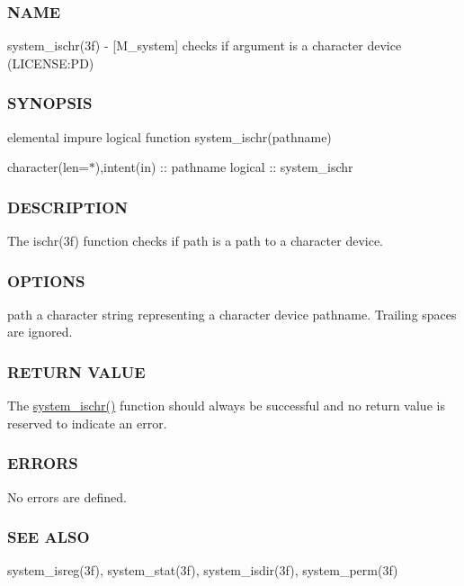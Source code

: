 \subsubsection*{N\+A\+ME}

system\+\_\+ischr(3f) -\/ \mbox{[}M\+\_\+system\mbox{]} checks if argument is a character device (L\+I\+C\+E\+N\+SE\+:PD) 

\subsubsection*{S\+Y\+N\+O\+P\+S\+IS}

elemental impure logical function system\+\_\+ischr(pathname)

character(len=$\ast$),intent(in) \+:\+: pathname logical \+:\+: system\+\_\+ischr

\subsubsection*{D\+E\+S\+C\+R\+I\+P\+T\+I\+ON}

The ischr(3f) function checks if path is a path to a character device.

\subsubsection*{O\+P\+T\+I\+O\+NS}

path a character string representing a character device pathname. Trailing spaces are ignored.

\subsubsection*{R\+E\+T\+U\+RN V\+A\+L\+UE}

The \mbox{\hyperlink{namespacem__system_a49f1d027d438aab86024660b0802768f}{system\+\_\+ischr()}} function should always be successful and no return value is reserved to indicate an error.

\subsubsection*{E\+R\+R\+O\+RS}

No errors are defined.

\subsubsection*{S\+EE A\+L\+SO}

system\+\_\+isreg(3f), system\+\_\+stat(3f), system\+\_\+isdir(3f), system\+\_\+perm(3f)

